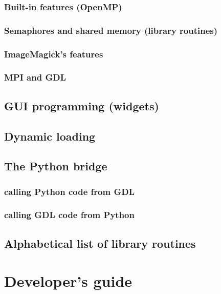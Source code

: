\documentclass[10pt,titleauthor,openany]{mwbk}
\begin{document}
  \section{Built-in features (OpenMP)}
  
  \section{Semaphores and shared memory (library routines)}
  
  \section{ImageMagick's features}
  \section{MPI and GDL}

  \chapter{GUI programming (widgets)}
  
 
  \chapter{Dynamic loading}
  

  \chapter{The Python bridge}
  
  \section{calling Python code from GDL}
  
  \section{calling GDL code from Python}
  

  \onecolumn
  \chapter{Alphabetical list of library routines}
  {
    \secondarysize
    \begin{multicols}{2}{}
    \end{multicols}
  }

  \part{Developer's guide}
  \twocolumn
\end{document}
